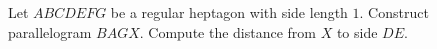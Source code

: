 Let $ABCDEFG$ be a regular heptagon with side length $1$. Construct parallelogram $BAGX$. Compute the distance from $X$ to side $DE$.